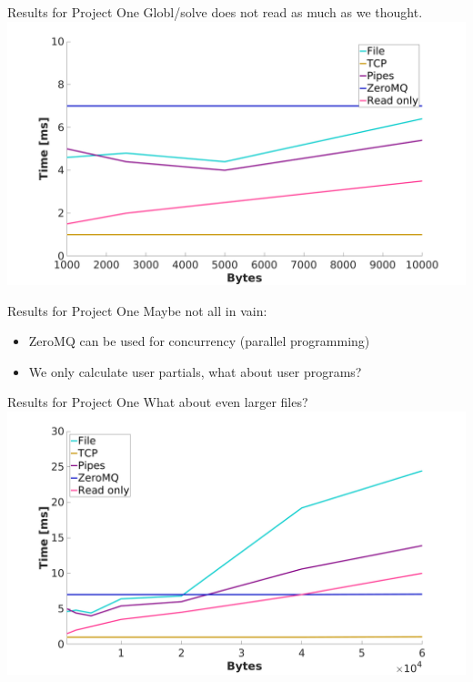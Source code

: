 \documentclass{beamer}
\begin{document}
    \begin{frame}{Results for Project One}
        Globl/solve does not read as much as we thought.
        \centering
        \includegraphics[width=1\columnwidth]{singlerun}
    \end{frame}
    \begin{frame}{Results for Project One}
        Maybe not all in vain:
        \pause
        \begin{itemize}[<+-|alert@+>]
            \item ZeroMQ can be used for concurrency (parallel programming)
            \item We only calculate user partials, what about user programs?
        \end{itemize}
    \end{frame}
    \begin{frame}{Results for Project One}
        What about even larger files?
        \centering
        \includegraphics[width=1\columnwidth]{singlerun_larger_files}
    \end{frame}
\end{document}

